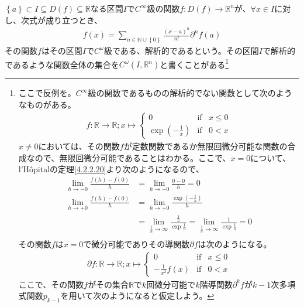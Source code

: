 \documentclass[dvipdfmx]{jsarticle}
\begin{document}
\begin{dfn}
$\left\{ a \right\} \subset I \subseteq D(f) \subseteq \mathbb{R}$なる区間$I$で$C^{\infty}$級の関数$f:D(f) \rightarrow \mathbb{R}^{n}$が、$\forall x \in I$に対し、次式が成り立つとき、
\begin{align*}
  f(x) = \sum_{n \in \mathbb{N} \cup \left\{ 0 \right\}} {\frac{(x - a)^n}{n!}\partial^n f(a)}
\end{align*}
その関数$f$はその区間$I$で$C^{\omega}$級である、解析的であるという。その区間$I$で解析的であるような関数全体の集合を$C^{\omega}\left( I,\mathbb{R}^{n} \right)$と書くことがある\footnote{ここで反例を。$C^{\infty}$級の関数であるものの解析的でない関数として次のようなものがある。
\begin{align*}
  f:\mathbb{R} \rightarrow \mathbb{R} ; x \mapsto \left\{ \begin{matrix}
    0 & \mathrm{if} & x \leq 0 \\
    \exp \left( -\frac{1}{x} \right) & \mathrm{if} & 0 < x
  \end{matrix}\right. 
\end{align*}
$x \ne 0$においては、その関数$f$が定数関数であるか無限回微分可能な関数の合成なので、無限回微分可能であることはわかる。ここで、$x=0$について、l'Hôpitalの定理\ref{4.2.2.20}より次のようになるので、
\begin{align*}
  \lim_{h\rightarrow-0} \frac{f\left( h\right) -f\left( 0\right) }{h} &= \lim_{h\rightarrow-0} \frac{0-0}{h} =0 \\
  \lim_{h\rightarrow+0} \frac{f\left( h\right) -f\left( 0\right) }{h} &= \lim_{h\rightarrow+0} \frac{\exp \left( -\frac{1}{h}\right)}{h} \\
  &= \lim_{\frac{1}{h}\rightarrow \infty } \frac{\frac{1}{h} }{\exp \frac{1}{h} } = \lim_{\frac{1}{h}\rightarrow \infty } \frac{1}{\exp \frac{1}{h} } = 0 \\
\end{align*}
その関数$f$は$x=0$で微分可能でありその導関数$\partial f$は次のようになる。
\begin{align*}
  \partial f:\mathbb{R} \rightarrow \mathbb{R} ; x \mapsto \left\{ \begin{matrix}
    0 & \mathrm{if} & x \leq 0 \\
    -\frac{1}{x^2 } f\left( x\right) & \mathrm{if} & 0 < x
  \end{matrix}\right. 
\end{align*}
ここで、その関数$f$がその集合$\mathbb{R}$で$k$回微分可能で$k$階導関数$\partial^k f$が$k-1$次多項式関数$p_{k-1} $を用いて次のようになると仮定しよう。
}
\end{dfn}
\end{document}
